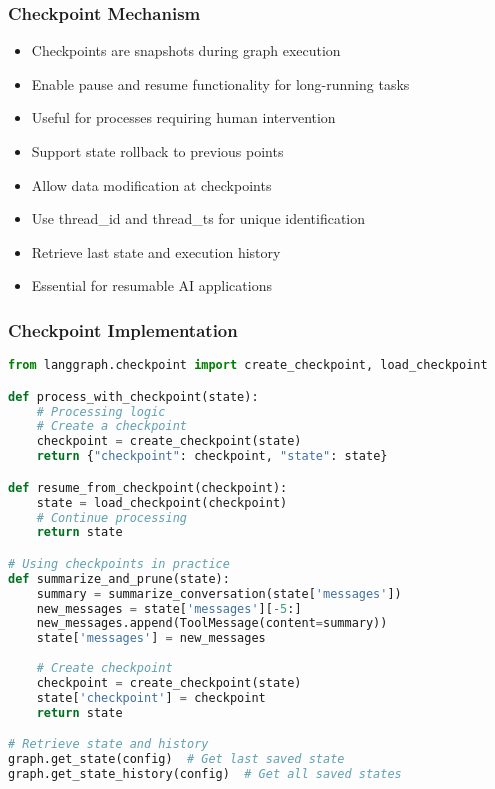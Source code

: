 \begin{frame}[fragile]\frametitle{Checkpoint Mechanism}
      \begin{itemize}
        \item Checkpoints are snapshots during graph execution
        \item Enable pause and resume functionality for long-running tasks
        \item Useful for processes requiring human intervention
        \item Support state rollback to previous points
        \item Allow data modification at checkpoints
        \item Use thread\_id and thread\_ts for unique identification
        \item Retrieve last state and execution history
        \item Essential for resumable AI applications
      \end{itemize}
\end{frame}

\begin{frame}[fragile]\frametitle{Checkpoint Implementation}
      \begin{lstlisting}[language=Python, basicstyle=\tiny]
from langgraph.checkpoint import create_checkpoint, load_checkpoint

def process_with_checkpoint(state):
    # Processing logic
    # Create a checkpoint
    checkpoint = create_checkpoint(state)
    return {"checkpoint": checkpoint, "state": state}

def resume_from_checkpoint(checkpoint):
    state = load_checkpoint(checkpoint)
    # Continue processing
    return state

# Using checkpoints in practice
def summarize_and_prune(state):
    summary = summarize_conversation(state['messages'])
    new_messages = state['messages'][-5:]
    new_messages.append(ToolMessage(content=summary))
    state['messages'] = new_messages
    
    # Create checkpoint
    checkpoint = create_checkpoint(state)
    state['checkpoint'] = checkpoint
    return state

# Retrieve state and history
graph.get_state(config)  # Get last saved state
graph.get_state_history(config)  # Get all saved states
      \end{lstlisting}
\end{frame}


